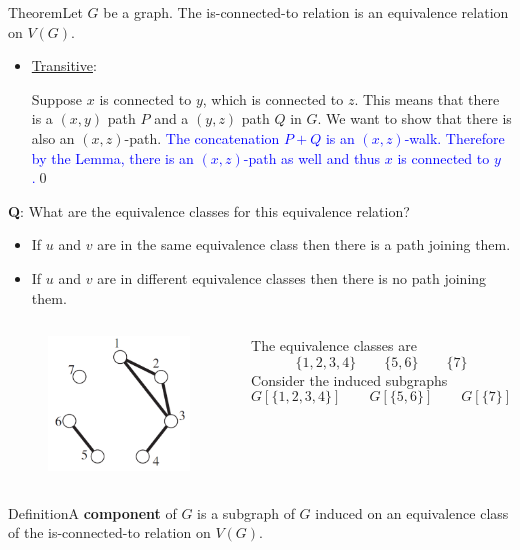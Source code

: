 \documentclass{beamer}
\def\bl[#1]#2{\begin{block}{#1}#2\end{block}}
\def\itemb{\begin{itemize}}
\def\iteme{\end{itemize}}
\begin{document}
\begin{frame}
\bl[Theorem]{Let $G$ be a graph. The is-connected-to relation is an equivalence relation on $V(G)$.}
\itemb
\item \underline{Transitive}:

Suppose $x$ is connected to $y$, which is connected to $z$. This means that there is a $(x,y)$ path $P$ and a $(y,z)$ path $Q$ in $G$. We want to show that there is also an $(x,z)$-path. \textcolor{blue}{The concatenation $P+Q$ is an $(x,z)$-walk. Therefore by the Lemma, there is an $(x,z)$-path as well and thus $x$ is connected to $y$.}\qed
\iteme
\end{frame}

\begin{frame}
\bl[]{\textbf{Q}: What are the equivalence classes for this equivalence relation? }
\itemb
\item If $u$ and $v$ are in the same equivalence class then there is a path joining them.
\item If $u$ and $v$ are in different equivalence classes then there is no path joining them.
\iteme\vspace{-0.1cm}

\begin{columns}
\vspace{-0.4cm}
\begin{figure}
\centering
\includegraphics[scale=0.25]{Connected.pdf}
\end{figure}
The equivalence classes are
\[
\{1,2,3,4\}\qquad \{5,6\}\qquad \{7\}
\]
Consider the induced subgraphs
\[
G[\{1,2,3,4\}]\qquad G[\{5,6\}]\qquad G[\{7\}]
\]
\end{columns}
\bl[Definition]{A \textbf{component} of $G$ is a subgraph of $G$ induced on an equivalence class of the is-connected-to relation on $V(G)$.}
\end{frame}
\end{document}
